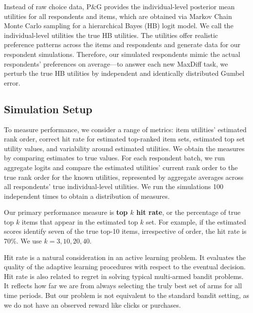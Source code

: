 \documentclass[a4paper,11pt]{article}
\begin{document}
Instead of raw choice data, P\&G provides the individual-level posterior mean utilities for all respondents and items, which are obtained via Markov Chain Monte Carlo sampling for a hierarchical Bayes (HB) logit model. We call the individual-level utilities the true HB utilities. The utilities offer realistic preference patterns across the items and respondents and generate data for our respondent simulations.  Therefore, our simulated respondents mimic the actual respondents' preferences on average---to answer each new MaxDiff task, we perturb the true HB utilities by independent and identically distributed Gumbel error.

\subsection{Simulation Setup}
To measure performance, we consider a range of metrics: item utilities' estimated rank order, correct hit rate for estimated top-ranked item sets, estimated top set utility values, and variability around estimated utilities. We obtain the measures by comparing estimates to true values. For each respondent batch, we run aggregate logits and compare the estimated utilities' current rank order to the true rank order for the known utilities, represented by aggregate averages across all respondents' true individual-level utilities. We run the simulations 100 independent times to obtain a distribution of measures. 

Our primary performance measure is \textbf{top $k$ hit rate}, or the percentage of true top $k$ items that appear in the estimated top $k$ set. For example, if the estimated scores identify seven of the true top-10 items, irrespective of order, the hit rate is 70\%. We use $k=3,10,20,40$. 

Hit rate is a natural consideration in an active learning problem. It evaluates the quality of the adaptive learning procedures with respect to the eventual decision. Hit rate is also related to regret in solving typical multi-armed bandit problems. It reflects how far we are from always selecting the truly best set of arms for all time periods. But our problem is not equivalent to the standard bandit setting, as we do not have an observed reward like clicks or purchases. 
\end{document}
